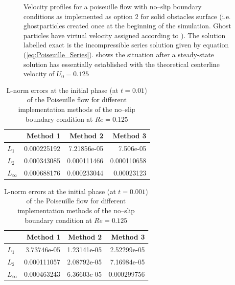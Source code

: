 \documentclass{report}
\begin{document}
\begin{figure}[!htbp]
\caption[Velocity profiles Poiseuille flow]{Velocity profiles for a poiseuille flow with no--slip boundary conditions as implemented as option 2 for solid obstacles surface (i.e. ghostparticles created once at the beginning of the simulation. Ghost particles have virtual velocity assigned according to \cite{Morris1999}  ). The solution labelled exact is the incompressible series solution given by equation (\ref{eq:Poiseuille_Series}).   shows the situation after a steady-state solution has essentially established with the theoretical centerline velocity of $U_0=0.125$}

\end{figure}

 
 
\begin{table}[h] %
\label{tab:2DSPH_LinearWall_Poiseuille_Errors_t0_001}
\centering
\begin{tabular}[c]{||l||r|r|r||} %
\hline
\hline
 &{\bf Method 1} & {\bf Method 2} & {\bf Method 3}\\
\hline
\hline
$L_1$&0.000225192 & 7.21856e-05 & 7.506e-05\\
\hline
$L_2$&0.000343085 & 0.000111466 & 0.000110658 \\
\hline
$L_\infty$&0.000688176 & 0.000233044 & 0.00023123 \\
\hline
\hline
\end{tabular}
  
  
\caption[]{L-norm errors at the initial phase (at $t=0.01$) of the Poiseuille flow 
for different implementation methods of the no--slip boundary condition at $Re=0.125$ }
\end{table}

\begin{table}[h] %
\label{tab:2DSPH_LinearWall_Poiseuille_Errors_t0_001}
\centering
\begin{tabular}[c]{||l||r|r|r||} %
\hline
\hline
 &{\bf Method 1} & {\bf Method 2} & {\bf Method 3}\\
\hline
\hline
$L_1$&3.73746e-05 & 1.23141e-05 & 2.52299e-05\\
\hline
$L_2$&0.000111057 & 2.08792e-05 & 7.16984e-05 \\
\hline
$L_\infty$&0.000463243 & 6.36603e-05 & 0.000299756 \\
\hline
\hline
\end{tabular}
  
  
\caption[]{L-norm errors at the initial phase (at $t=0.001$) of the Poiseuille flow 
for different implementation methods of the no--slip boundary condition at $Re=0.125$}
\end{table}
\end{document}
